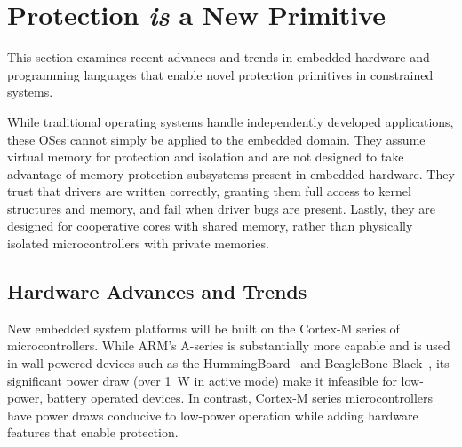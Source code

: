 \section{Protection \emph{is} a New Primitive}
\label{protection}


%
This section examines recent advances and trends in embedded hardware and
programming languages that enable novel protection primitives in constrained
systems.

While traditional operating systems handle independently developed applications,
these OSes cannot simply be applied to the embedded domain. They assume virtual memory
for protection and isolation and are not designed to take advantage of memory protection subsystems
present in embedded hardware. They trust that drivers are written correctly,
granting them full access to kernel structures and memory, and fail when driver bugs
are present. Lastly, they are designed for cooperative cores with shared memory,
rather than physically isolated microcontrollers with private memories.


\subsection{Hardware Advances and Trends}

New embedded system platforms will be built on the Cortex-M series of microcontrollers.
While ARM's A-series is substantially more capable and is used in wall-powered
devices such as the HummingBoard~\cite{hummingboard} and BeagleBone Black~\cite{bbb},
its significant power draw (over 1~W in active mode) make it infeasible for
low-power, battery operated devices.
In contrast, Cortex-M series microcontrollers have power draws conducive to
low-power operation while adding hardware features that enable protection.



